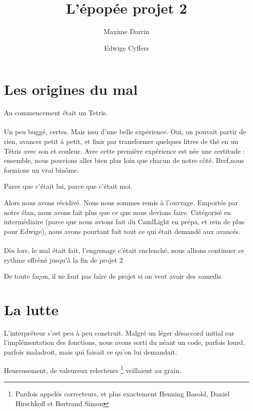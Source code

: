 \documentclass{article}
\title{L'épopée projet 2}
\author{Maxime Darrin  \and Edwige Cyffers }
\date{}
\begin{document}
\maketitle

\section{Les origines du mal}

	Au commencement était un Tetris.
	
	\paragraph{}
	Un peu buggé, certes. Mais issu d'une belle expérience. Oui, on pouvait partir de rien, avancer petit à petit, et finir par transformer quelques litres de thé en un Tétris avec son et couleur. Avec cette première expérience est née une certitude : ensemble, nous pouvions aller bien plus loin que chacun de notre côté. Bref,nous formions un vrai binôme.
	
	Parce que c'était lui, parce que c'était moi.
	
	
	Alors nous avons récidivé. Nous nous sommes remis à l'ouvrage. Emportés par notre élan, nous avons fait plus que ce que nous devions faire. Catégorisé en intermédiaire (parce que nous avions fait du CamlLight en prépa, et rein de plus pour Edwige), nous avons pourtant fait tout ce qui était demandé aux avancés.
	
	
	\paragraph{}
	Dès lors, le mal était fait, l'engrenage c'était enclenché, nous allions continuer ce rythme effréné jusqu'à la fin de projet 2
	
	De toute façon, il ne faut pas faire de projet si on veut avoir des samedis.
	

\section{La lutte}

	
	L'interpréteur s'est peu à peu construit. Malgré un léger désaccord initial sur l'implémentation des fonctions, nous avons sorti du néant un code, parfois lourd, parfois maladroit, mais qui faisait ce qu'on lui demandait.
	
	Heureusement, de valeureux relecteurs \footnote{Pardois appelés correcteurs, et plus exactement Henning Basold,
	Daniel Hirschkoff et 
	Bertrand Simon} veillaient au grain.
\end{document}
